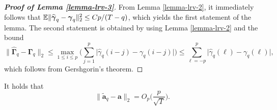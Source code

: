 \begin{proof}[\textnormal{\textbf{Proof of Lemma \ref{lemma-lrv-3}}}] 
From Lemma \ref{lemma-lrv-2}, it immediately follows that $\mathbb{E} \| \widehat{\boldsymbol{\gamma}}_q - \boldsymbol{\gamma}_q \|_2^2 \le C p / (T-q)$, which yields the first statement of the lemma. The second statement is obtained by using Lemma \ref{lemma-lrv-2} and the bound
\[ \| \widehat{\boldsymbol{\Gamma}}_q - \boldsymbol{\Gamma}_q \|_2 \le \max_{1 \le i \le p} \Big( \sum\limits_{j=1}^p \big| \widehat{\gamma}_q(i-j) - \gamma_q(i-j) \big| \Big) \le \sum\limits_{\ell=-p}^p \big| \widehat{\gamma}_q(\ell) - \gamma_q(\ell) \big|, \]
which follows from Gershgorin's theorem. 
\end{proof}


\begin{lemmaA}\label{lemma-lrv-4}
It holds that 
\[ \| \widetilde{\boldsymbol{a}}_q - \boldsymbol{a} \|_2 = O_p\Big( \frac{p}{\sqrt{T}} \Big). \]
\end{lemmaA}



